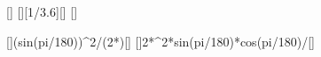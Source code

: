 [\mpss]
[\kmph][1/3.6][\mps]
[\degree]

[]{(\vfX*sin(\alX*pi/180))^2/(2*\gEX)}[\m]
[]{2*\vfX^2*sin(\alX*pi/180)*cos(\alX*pi/180)/\gEX}[\m]
